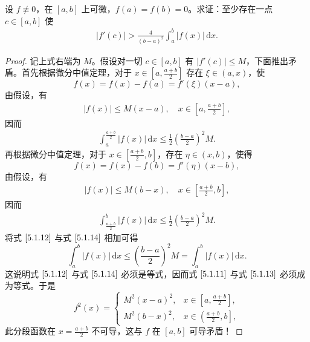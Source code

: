 \documentclass[../../main.tex]{subfiles}
\begin{document}
\begin{example}
设 \( f \not\equiv 0 \)，在 \( [a,b] \) 上可微，\( f(a) = f(b) = 0 \)。求证：至少存在一点 \( c \in [a,b] \) 使
\begin{align}
|f'(c)| > \frac{4}{(b - a)^2} \int_{a}^{b} |f(x)| \, \mathrm{d}x. \label{5.1.10}
\end{align}
\end{example}
\begin{proof}
记上式右端为 \( M \)。假设对一切 \( c \in [a,b] \) 有 \( |f'(c)| \leqslant M \)，下面推出矛盾。首先根据微分中值定理，对于 \( x \in \left[ a, \frac{a + b}{2} \right] \) 存在 \( \xi \in (a,x) \)，使
\[
f(x) = f(x) - f(a) = f'(\xi)(x - a),
\]
由假设，有
\begin{align}
|f(x)| \leqslant M(x - a), \quad x \in \left[ a, \frac{a + b}{2} \right], \label{5.1.11}
\end{align}
因而
\begin{align}
\int_{a}^{\frac{a + b}{2}} |f(x)| \, \mathrm{d}x \leqslant \frac{1}{2} \left( \frac{b - a}{2} \right)^2 M. \label{5.1.12}
\end{align}
再根据微分中值定理，对于 \( x \in \left[ \frac{a + b}{2}, b \right] \)，存在 \( \eta \in (x,b) \)，使得
\[
f(x) = f(x) - f(b) = f'(\eta)(x - b),
\]
由假设，有
\begin{align}
|f(x)| \leqslant M(b - x), \quad x \in \left[ \frac{a + b}{2}, b \right], \label{5.1.13}
\end{align}
因而
\begin{align}
\int_{\frac{a + b}{2}}^{b} |f(x)| \, \mathrm{d}x \leqslant \frac{1}{2} \left( \frac{b - a}{2} \right)^2 M. \label{5.1.14}
\end{align}
将式 \(\eqref{5.1.12}\) 与式 \(\eqref{5.1.14}\) 相加可得
\[
\int_{a}^{b} |f(x)| \, \mathrm{d}x \leqslant \left( \frac{b - a}{2} \right)^2 M = \int_{a}^{b} |f(x)| \, \mathrm{d}x.
\]
这说明式 \(\eqref{5.1.12}\) 与式 \(\eqref{5.1.14}\) 必须是等式，因而式 \(\eqref{5.1.11}\) 与式 \(\eqref{5.1.13}\) 必须成为等式。于是
\[
f^2(x) = 
\begin{cases} 
M^2(x - a)^2, & x \in \left[ a, \frac{a + b}{2} \right], \\
M^2(b - x)^2, & x \in \left( \frac{a + b}{2}, b \right], 
\end{cases}
\]
此分段函数在 \( x = \frac{a + b}{2} \) 不可导，这与 \( f \) 在 \([a,b]\) 可导矛盾！

\end{proof}
\end{document}
